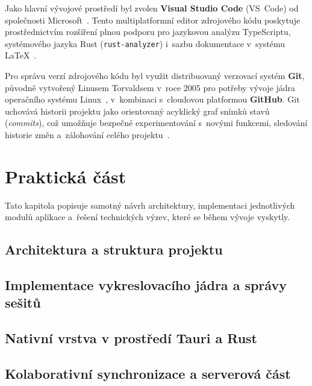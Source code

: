 \documentclass[12pt, a4paper, oneside]{article}
\begin{document}
Jako hlavní vývojové prostředí byl zvolen \textbf{Visual Studio Code} (VS~Code) od společnosti Microsoft~\cite{vscode_docs}. Tento multiplatformní editor zdrojového kódu poskytuje prostřednictvím rozšíření plnou podporu pro jazykovou analýzu TypeScriptu, systémového jazyka Rust (\texttt{rust-analyzer}) i~sazbu dokumentace v~systému \LaTeX~\cite{vscode_docs}.

Pro správu verzí zdrojového kódu byl využit distribuovaný verzovací systém \textbf{Git}, původně vytvořený Linusem Torvaldsem v~roce 2005 pro potřeby vývoje jádra operačního systému Linux~\cite{chacon2014git}, v~kombinaci s~cloudovou platformou \textbf{GitHub}. Git uchovává historii projektu jako orientovaný acyklický graf snímků stavů (\textit{commits}), což umožňuje bezpečné experimentování s~novými funkcemi, sledování historie změn a~zálohování celého projektu~\cite{chacon2014git}.


\section{Praktická část}
\label{sec:prakticka}

Tato kapitola popisuje samotný návrh architektury, implementaci jednotlivých modulů aplikace a~řešení technických výzev, které se během vývoje vyskytly.

\subsection{Architektura a struktura projektu}
\label{sec:architektura}

\subsection{Implementace vykreslovacího jádra a správy sešitů}
\label{sec:implementace_canvas}

\subsection{Nativní vrstva v prostředí Tauri a Rust}
\label{sec:implementace_tauri}

\subsection{Kolaborativní synchronizace a serverová část}
\label{sec:implementace_sync}
\end{document}

